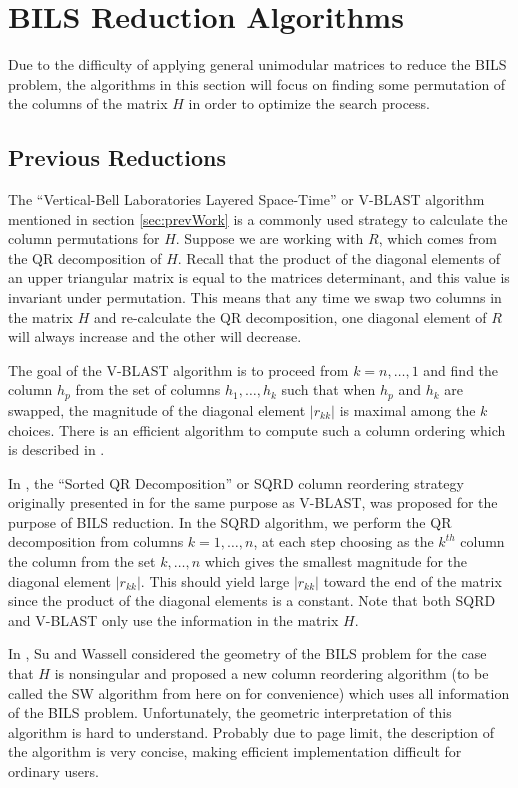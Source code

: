 \documentclass[12pt,Bold,letterpaper]{mcgilletdclass}
\newcommand{\vsp}{\vspace{\baselineskip}}
\begin{document}
\vsp \section{BILS Reduction Algorithms} \label{sec:BILSReduction}

Due to the difficulty of applying general unimodular matrices to reduce the BILS problem, the algorithms in this section will focus on finding some permutation of the columns of the matrix $H$ in order to optimize the search process.

\vsp \subsection{Previous Reductions}

The ``Vertical-Bell Laboratories Layered Space-Time'' or V-BLAST algorithm \cite{FosGVW99} mentioned in section \ref{sec:prevWork} is a commonly used strategy to calculate the column permutations for $H$. Suppose we are working with $R$, which comes from the QR decomposition of $H$. Recall that the product of the diagonal elements of an upper triangular matrix is equal to the matrices determinant, and this value is invariant under permutation. This means that any time we swap two columns in the matrix $H$ and re-calculate the QR decomposition, one diagonal element of $R$ will always increase and the other will decrease.

The goal of the V-BLAST algorithm is to proceed from $k=n, \dots,1$ and find the column $h_p$ from the set of columns $h_1, \dots, h_k$ such that when $h_p$ and $h_k$ are swapped, the magnitude of the diagonal element $|r_{kk}|$ is maximal among the $k$ choices. There is an efficient algorithm to compute such a column ordering which is described in \cite{ChaP07}.

In \cite{ChaH05}, the ``Sorted QR Decomposition'' or SQRD column reordering strategy originally presented in \cite{WubBRKK01} for the same purpose as V-BLAST, was proposed for the purpose of BILS reduction. In the SQRD algorithm, we perform the QR decomposition from columns $k = 1,\dots, n$, at each step choosing as the $k^{th}$ column the column from the set $k,\dots,n$ which gives the smallest magnitude for the diagonal element $|r_{kk}|$. This should yield large $|r_{kk}|$ toward the end of the matrix since the product of the diagonal elements is a constant. Note that both SQRD and V-BLAST only use the information in the matrix $H$.

In \cite{SuW05}, Su and Wassell considered the geometry of the BILS
problem for the case that $H$ is nonsingular and proposed a new column reordering algorithm (to be called
the SW algorithm from here on for convenience) which uses all information of the BILS problem.
Unfortunately, the geometric interpretation of this algorithm is hard to understand.
Probably due to page limit, the description of the algorithm is very concise, 
making efficient implementation difficult for ordinary users.
\end{document}
